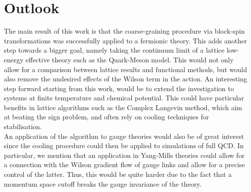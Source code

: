 \section*{Outlook}
The main result of this work is that the coarse-graining procedure via block-spin transformations was successfully applied to a fermionic theory. This adds another step towards a bigger goal, namely taking the continuum limit of a lattice low-energy effective theory such as the Quark-Meson model. 
This would not only allow for a comparison between lattice results and functional methods, but would also remove the undesired effects of the Wilson term in the action. An interesting step forward starting from this work, would be to extend the investigation to systems at finite temperature and chemical potential. 
This could have particular benefits in lattice algorithms such as the Complex Langevin method, which aim at beating the sign problem, and often rely on cooling techniques for stabilisation. \\
An application of the algorithm to gauge theories would also be of great interest since the cooling procedure could then be applied to simulations of full QCD.  
In particular, we mention that an application in Yang-Mills theories could allow for a connection with the Wilson gradient flow of gauge links and allow for a precise control of the latter. Thus, this would be quite harder due to the fact that a momentum space cutoff breaks the gauge invariance of the theory.